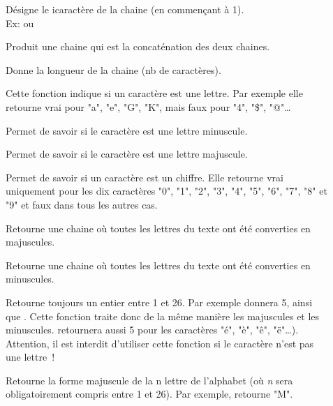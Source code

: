 	\begin{description}
	\item[]
		Désigne le i\ieme caractère de la chaine (en commençant à 1).
		\\Ex: 
		ou 
	\item[]
		Produit une chaine qui est la concaténation des deux chaines.
	\item[]
		Donne la longueur de la chaine (nb de caractères).
	\item[]
		Cette fonction indique si un caractère est une lettre. 
		Par exemple elle retourne vrai pour "a", "e", "G", "K", 
		mais faux pour "4", "\$", "@"\dots %
	\item[]	
		Permet de savoir si le caractère est une lettre minuscule.
	\item[]	
		Permet de savoir si le caractère est une lettre majuscule.
	\item[]	
		Permet de savoir si un caractère est un chiffre. 
		Elle retourne vrai uniquement pour les dix caractères 
		"0", "1", "2", "3", "4", "5", "6", "7", "8" et "9" 
		et faux dans tous les autres cas.
	\item[]
		Retourne une chaine où toutes les lettres du texte
		ont été converties en majuscules.
	\item[]
		Retourne une chaine où toutes les lettres du texte
		ont été converties en minuscules.
	\item[]
		Retourne toujours un entier entre 1 et 26. 
		Par exemple  donnera 5, 
		ainsi que . 
		Cette fonction traite donc de la même manière 
		les majuscules et les minuscules. 
		 retournera aussi 5 pour les caractères "é", "è", "ê", "ë"\dots). 
		Attention, il est interdit d’utiliser cette fonction 
		si le caractère n’est pas une lettre~!
	\item[]
		Retourne la forme majuscule de la n\ieme{} lettre de l’alphabet 
		(où \textit{n} sera obligatoirement compris entre 1 et 26). 
		Par exemple,  retourne "M".
	\item[]

\end{description}
